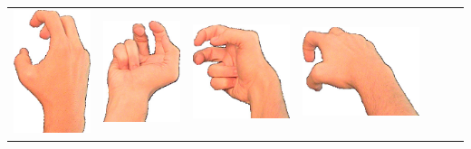 \documentclass{article}
\begin{document}
\begin{center}
\begin{tabular}{r*{6}{c}}
\includegraphics[scale=0.1]{images/03-05-3.jpg}&
\includegraphics[scale=0.1]{images/03-05-4.jpg}&
\includegraphics[scale=0.1]{images/03-05-5.jpg}&
\includegraphics[scale=0.1]{images/03-05-6.jpg}\\

\end{tabular}
\end{center}
\end{document}
